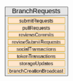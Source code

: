 


\begin{figure}[h!]
  \begin{center}
    \includegraphics[width=0.25\textwidth]{src/img/MempoolV3.png}
\end{center}
 \caption{}
 \label{fig:mempool}
\end{figure}
